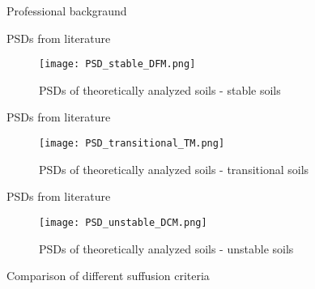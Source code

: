 \documentclass[10pt,xcolor=dvipsnames]{beamer}
\begin{document}
{\begin{frame}{Professional backgraund}
{\begin{frame}{PSDs from literature}

\begin{figure}

\texttt{[image: PSD\_stable\_DFM.png]} 
\vspace{-0.5cm}
       \caption{PSDs of theoretically analyzed soils - stable soils }
        \label{fig:stb}
\end{figure}

\end{frame}
}



\begin{frame}{PSDs from literature}
\begin{figure}
\texttt{[image: PSD\_transitional\_TM.png]} 
\vspace{-0.5cm}
       \caption{PSDs of theoretically analyzed soils - transitional soils }
        \label{fig:trnas}
\end{figure}

\end{frame}
\begin{frame}{PSDs from literature}
\begin{figure}
\texttt{[image: PSD\_unstable\_DCM.png]} 
\vspace{-0.5cm}
       \caption{PSDs of theoretically analyzed soils - unstable soils }
        \label{fig:unstab}
\end{figure}
\end{frame}

\begin{frame}{Comparison of different suffusion criteria}

\begin{table}[b]


\end{table}
\end{frame}
\end{frame}}
\end{document}
